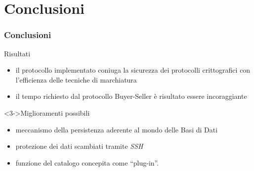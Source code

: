 \section{Conclusioni}
\begin{frame}
\frametitle{Conclusioni}
\begin{block}{Risultati}
\begin{itemize}
	\item<1-> il protocollo implementato coniuga la sicurezza dei protocolli crittografici con l'efficienza delle tecniche di marchiatura
	\item<2-> il tempo richiesto dal protocollo Buyer-Seller è risultato essere incoraggiante
	
\end{itemize}
\end{block}
\begin{block}<3->{Miglioramenti possibili}
\begin{itemize}
	\item<4-> meccanismo della persistenza aderente al mondo delle Basi di Dati
	\item<5-> protezione dei dati scambiati tramite \emph{SSH}
	\item<6-> funzione del catalogo concepita come ``plug-in''. 
	\end{itemize}
\end{block}
\end{frame}
